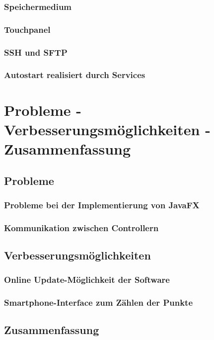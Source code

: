 \subsubsection{Speichermedium}
\subsubsection{Touchpanel}
\subsubsection{SSH und SFTP}
\subsubsection{Autostart realisiert durch Services}

\section{Probleme - Verbesserungsmöglichkeiten - Zusammenfassung}
\subsection{Probleme}
\subsubsection{Probleme bei der Implementierung von JavaFX}
\subsubsection{Kommunikation zwischen Controllern}
\subsection{Verbesserungsmöglichkeiten}
\subsubsection{Online Update-Möglichkeit der Software}
\subsubsection{Smartphone-Interface zum Zählen der Punkte}
\subsection{Zusammenfassung}